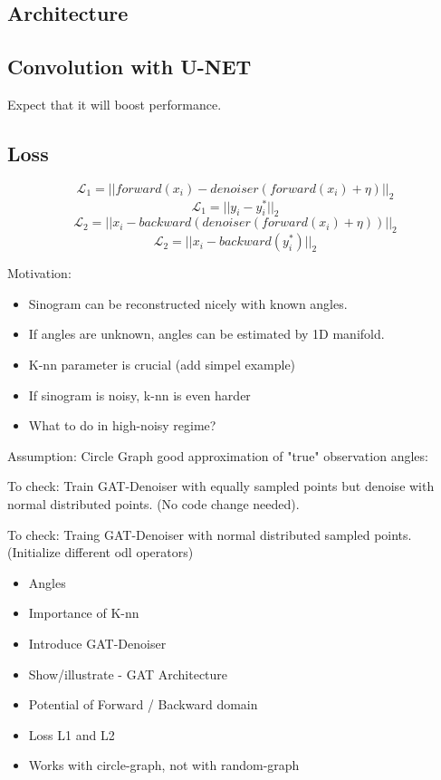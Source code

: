 \subsection{Architecture}

\subsection{Convolution with U-NET}
Expect that it will boost performance.


\subsection{Loss}


$$ \mathcal{L}_1 = || forward(x_i) - denoiser(forward(x_i) + \eta) ||_2 $$ 
$$ \mathcal{L}_1 = || y_i - y_i^* ||_2 $$ 
$$ \mathcal{L}_2 = || x_i - backward (denoiser(forward(x_i) + \eta)) ||_2 $$ 
$$ \mathcal{L}_2 = || x_i - backward (y_i^*) ||_2 $$


Motivation:
\begin{itemize}
  \item Sinogram can be reconstructed nicely with known angles.
  \item If angles are unknown, angles can be estimated by 1D manifold.
  \item K-nn parameter is crucial (add simpel example)
  \item If sinogram is noisy, k-nn is even harder
  \item What to do in high-noisy regime?
\end{itemize}

Assumption:
Circle Graph good approximation of "true" observation angles:

To check:
Train GAT-Denoiser with equally sampled points but denoise with
normal distributed points.
(No code change needed).

To check:
Traing GAT-Denoiser with normal distributed sampled points.
(Initialize different odl operators)



\begin{itemize}
  \item Angles 
  \item Importance of K-nn 
  \item Introduce GAT-Denoiser
  \item Show/illustrate - GAT Architecture
  \item Potential of Forward / Backward domain
  \item Loss L1 and L2
  \item Works with circle-graph, not with random-graph
\end{itemize}